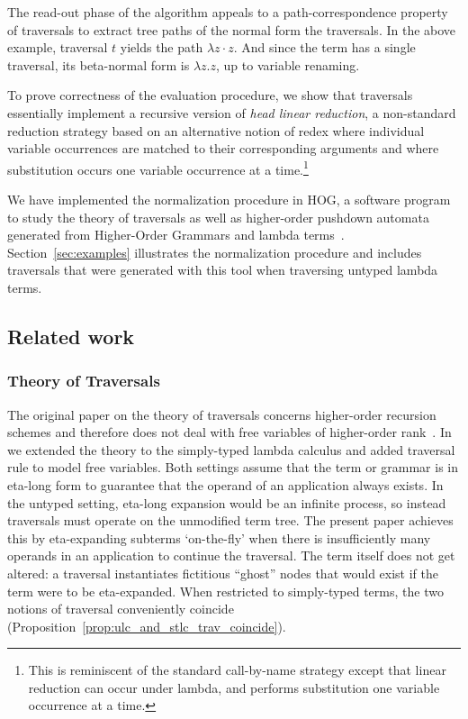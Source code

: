 \documentclass{elsarticle}
\theoremstyle{plain}
\theoremstyle{definition}
\theoremstyle{remark}
\begin{document}
The read-out phase of the algorithm appeals to a path-correspondence property of traversals to extract tree paths of the normal form the traversals. In the above example, traversal $t$ yields the path $\lambda z \cdot z$. And since the term has a single traversal, its beta-normal form is $\lambda z. z$, up to variable renaming.

 To prove correctness of the evaluation procedure, we show that traversals essentially implement a recursive version of \emph{head linear reduction}, a non-standard reduction strategy based on an alternative notion of redex where individual variable occurrences are matched to their corresponding arguments and where substitution occurs one variable occurrence at a time.\footnote{This is reminiscent of the standard call-by-name strategy except that linear reduction can occur under lambda, and performs substitution one variable occurrence at a time.}

 We have implemented the normalization procedure in HOG, a software program to study the theory of traversals as well as higher-order pushdown automata generated from Higher-Order Grammars and lambda terms~\cite{BlumGalop2008,Blum-HogTool}.  Section~\ref{sec:examples} illustrates the normalization procedure and includes traversals that were generated with this tool when traversing untyped lambda terms.

\subsection{Related work}

\subsubsection{Theory of Traversals}

The original paper on the theory of traversals concerns higher-order recursion schemes and therefore does not deal with free variables of higher-order rank~\cite{OngLics2006}. In~\cite{BlumPhd} we extended the theory to the simply-typed lambda calculus and added traversal rule to model free variables. Both settings assume that the term or grammar is in eta-long form to guarantee that the operand of an application always exists.
In the untyped setting, eta-long expansion would be an infinite process, so instead traversals must operate on the unmodified term tree.
The present paper achieves this by eta-expanding subterms `on-the-fly' when there is insufficiently many operands in an application to continue the traversal. The term itself does not get altered: a traversal instantiates fictitious ``ghost'' nodes that would exist if the term were to be eta-expanded.
When restricted to simply-typed terms, the two notions of traversal conveniently coincide (Proposition~\ref{prop:ulc_and_stlc_trav_coincide}).
\end{document}
